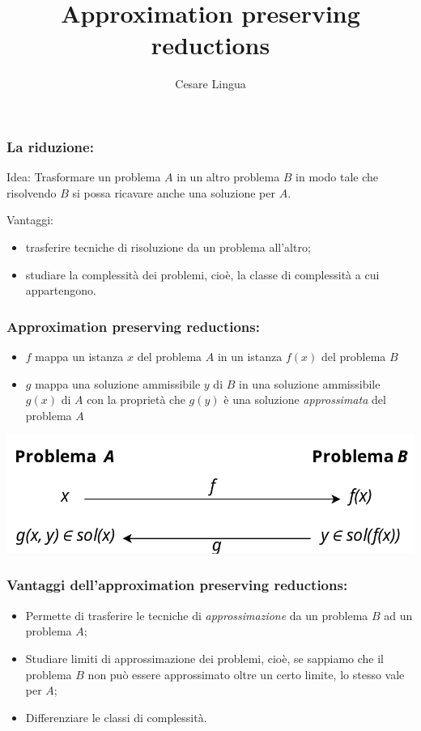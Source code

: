 \documentclass{beamer}
\title{Approximation preserving reductions}
\author{Cesare Lingua}
\institute{Università degli Studi di Torino}
\date{}
\begin{document}
 
\frame{\titlepage}

 
 
\begin{frame}
\frametitle{La riduzione:}
    \begin{block}{Idea:}
        Trasformare un problema $A$ in un altro problema $B$ in modo tale che risolvendo $B$ si possa ricavare anche una soluzione per $A$.

    \end{block}
    \begin{block}{Vantaggi:}
        \begin{itemize}
            \item trasferire tecniche di risoluzione da un problema all'altro;
            \item studiare la complessità dei problemi, cioè, la classe di complessità a cui appartengono.
        \end{itemize}
    \end{block}

\end{frame}

\begin{frame}
\frametitle{Approximation preserving reductions:}
    \begin{itemize}
        \item $f$ mappa un istanza $x$ del problema $A$ in un istanza $f(x)$ del problema $B$
        \item $g$ mappa una soluzione ammissibile $y$ di $B$ in una soluzione ammissibile $g(x)$ di $A$  con la proprietà che $g(y)$ è una soluzione \textit{approssimata} del problema $A$ 
    \end{itemize}

    \begin{center}
    \includegraphics[width=\textwidth]{../images/schema.png}
    \end{center}
    
\end{frame}

\begin{frame}
    \frametitle{Vantaggi dell'approximation preserving reductions:}
        \begin{itemize}
         \item Permette di trasferire le tecniche di \textit{approssimazione} da un problema $B$ ad un problema $A$;
         \item Studiare limiti di approssimazione dei problemi, cioè, se sappiamo che il problema $B$ non può essere approssimato oltre un certo limite, lo stesso vale per $A$;
         \item Differenziare le classi di complessità.
        
        \end{itemize}        
\end{frame}
\end{document}
